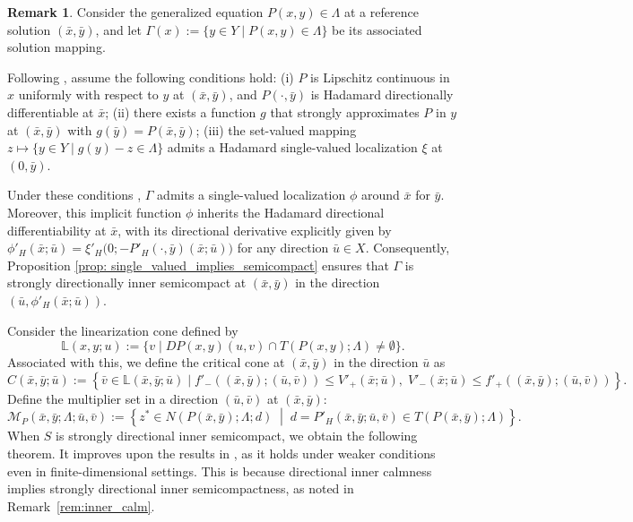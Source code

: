 \documentclass[12pt,twoside,reqno]{amsart}
\theoremstyle{definition}
\newtheorem{remark}[theorem]{Remark}
\numberwithin{equation}{section}
\begin{document}
\begin{remark}\label{rem:strongly_directional_inner_semicompactness_ift}
Consider the generalized equation $P(x, y) \in \Lambda$ at a reference solution $(\bar{x}, \bar{y})$, and let $\Gamma(x) := \{ y \in Y \mid P(x, y) \in \Lambda \}$ be its associated solution mapping. 

Following \cite[Theorem 2.4]{dontchev1995implicit}, assume the following conditions hold:
(i) $P$ is Lipschitz continuous in $x$ uniformly with respect to $y$ at $(\bar{x}, \bar{y})$, and $P(\cdot, \bar{y})$ is Hadamard directionally differentiable at $\bar{x}$;
(ii) there exists a function $g$ that strongly approximates $P$ in $y$ at $(\bar{x}, \bar{y})$ with $g(\bar{y}) = P(\bar{x}, \bar{y})$;
(iii) the set-valued mapping $z \mapsto \{y \in Y \mid g(y) - z \in \Lambda\}$ admits a Hadamard single-valued localization $\xi$ at $(0, \bar{y})$. 

Under these conditions \cite[Theorem 2.4, Remark 2.6]{dontchev1995implicit}, $\Gamma$ admits a single-valued localization $\phi$ around $\bar{x}$ for $\bar{y}$. Moreover, this implicit function $\phi$ inherits the Hadamard directional differentiability at $\bar{x}$, with its directional derivative explicitly given by $\phi'_H(\bar{x}; \bar{u}) = \xi'_H\big(0; -P'_H(\cdot, \bar{y})(\bar{x}; \bar{u})\big)$ for any direction $\bar{u} \in X$. 
Consequently, Proposition \ref{prop: single_valued_implies_semicompact} ensures that $\Gamma$ is strongly directionally inner semicompact at $(\bar{x}, \bar{y})$ in the direction $(\bar{u}, \phi'_H(\bar{x}; \bar{u}))$.
\end{remark}
 Consider the linearization cone defined by
    \begin{equation*}
        \mathbb{L}(x, y; u) := \{ v \mid DP(x, y)(u, v) \cap T(P(x, y); \Lambda) \neq \emptyset \}.
    \end{equation*}
    Associated with this, we define the critical cone at $(\bar x,\bar y)$ in the direction $\bar u$ as 
    \begin{equation*}
        C(\bar{x}, \bar{y}; \bar{u}) := \left\{ \bar{v} \in \mathbb{L}(\bar{x}, \bar{y}; \bar{u}) \mid f'_{-}((\bar{x}, \bar{y}); (\bar{u}, \bar{v})) \leq V'_{+}(\bar{x}; \bar{u}), \; V'_{-}(\bar{x}; \bar{u}) \leq f'_{+}((\bar{x}, \bar{y}); (\bar{u}, \bar{v})) \right\}.
    \end{equation*}
Define the multiplier set in a direction $(\bar u,\bar v)$ at $(\bar x,\bar y)$:  
\begin{equation*}
    \mathcal{M}_P(\bar{x}, \bar{y}; \Lambda;\bar{u}, \bar{v}) := \left\{ z^* \in N(P(\bar{x}, \bar{y}); \Lambda; d) \;\middle|\; d = P'_H(\bar{x}, \bar{y}; \bar{u}, \bar{v}) \in T(P(\bar{x}, \bar{y});\Lambda) \right\}. 
\end{equation*}
When $S$ is strongly directional inner semicompact, we obtain the following theorem. It improves upon the results in \cite[Theorems~3.1(iv) and 3.2(iv)]{Bai2023Directional}, as it holds under weaker conditions even in finite-dimensional settings. This is because directional inner calmness implies strongly directional inner semicompactness, as noted in Remark~\ref{rem:inner_calm}.     
\end{document}
